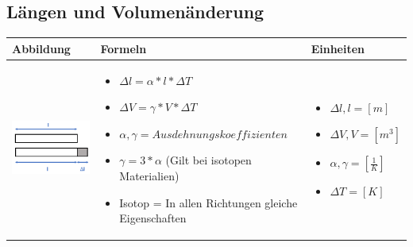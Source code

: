 \subsection{Längen und Volumenänderung}				%
\begin{table}[h!]
	\begin{tabular}{ | m{6cm} | m{8cm} | m{4cm} | }
		\hline
		Abbildung & Formeln & Einheiten \\ \hline
		\midrule
		\begin{minipage}{.3\textwidth}
			\includegraphics[width=6.0cm]{Figures/Deltal}
		\end{minipage}
		&
		\begin{itemize}
			\item $\Delta l=\alpha*l*\Delta T$	
			\item $\Delta V=\gamma*V*\Delta T$	
			\item $\alpha,\gamma=Ausdehnungskoeffizienten$
			\item $\gamma=3*\alpha$ (Gilt bei isotopen Materialien)
			\item Isotop = In allen Richtungen gleiche Eigenschaften	
		\end{itemize}
		& 
		\begin{itemize}
			\item $\Delta l,l= [m]$
			\item $\Delta V,V=[m^3]$
			\item $\alpha,\gamma=[\frac{1}{K}]$	
			\item $\Delta T=[K]$
		\end{itemize}
		\\ \hline
	\end{tabular}
\end{table}

